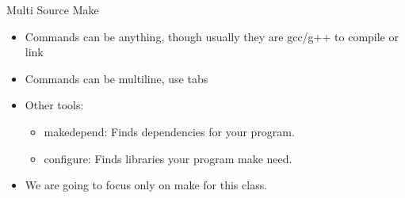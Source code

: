 \documentclass{beamer}
\begin{document}
\begin{frame}{Multi Source Make}
\begin{itemize}
\item Commands can be anything, though usually they are gcc/g++ to compile or link
\item Commands can be multiline, use tabs
\item Other tools:
\begin{itemize}
\item makedepend: Finds dependencies for your program.
\item configure: Finds libraries your program make need.
\end{itemize}
\item We are going to focus only on make for this class.
\end{itemize}
\end{frame}

%
\end{document}
